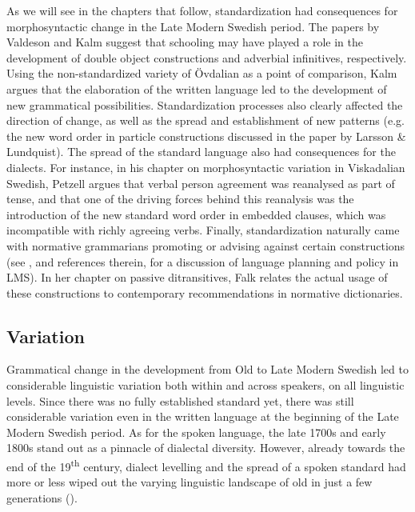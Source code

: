 \documentclass[output=paper]{langscibook}
\begin{document}
As we will see in the chapters that follow, standardization had consequences for morphosyntactic change in the Late Modern Swedish period. The papers by Valdeson and Kalm suggest that schooling may have played a role in the development of double object constructions and adverbial infinitives, respectively. Using the non-standardized variety of Övdalian as a point of comparison, Kalm argues that the elaboration of the written language led to the development of new grammatical possibilities. Standardization processes also clearly affected the direction of change, as well as the spread and establishment of new patterns (e.g. the new word order in particle constructions discussed in the paper by Larsson \& Lundquist). The spread of the standard language also had consequences for the dialects. For instance, in his chapter on morphosyntactic variation in Viskadalian Swedish, Petzell argues that verbal person agreement was reanalysed as part of tense, and that one of the driving forces behind this reanalysis was the introduction of the new standard word order in embedded clauses, which was incompatible with richly agreeing verbs. Finally, standardization naturally came with normative grammarians promoting or advising against certain constructions (see \citealt{Teleman2002, Teleman2003Tradis}, and references therein, for a discussion of language planning and policy in LMS). In her chapter on passive ditransitives, Falk relates the actual usage of these constructions to contemporary recommendations in normative dictionaries. 


\subsection{Variation}\label{sec:intro:2.2}


Grammatical change in the development from Old to Late Modern Swedish led to considerable linguistic variation both within and across speakers, on all linguistic levels. Since there was no fully established standard yet, there was still considerable variation even in the written language at the beginning of the Late Modern Swedish period. As for the spoken language, the late 1700s and early 1800s stand out as a pinnacle of dialectal diversity. However, already towards the end of the 19\textsuperscript{th} century, dialect levelling and the spread of a spoken standard had more or less wiped out the varying linguistic landscape of old in just a few generations (\citealt{NilssonPetzell2015}).
\end{document}

